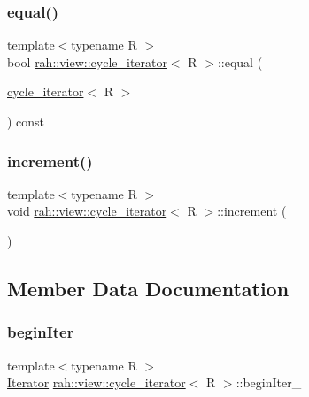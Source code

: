 \subsubsection{\texorpdfstring{equal()}{equal()}}
{\footnotesize\ttfamily template$<$typename R $>$ \\
bool \mbox{\hyperlink{structrah_1_1view_1_1cycle__iterator}{rah\+::view\+::cycle\+\_\+iterator}}$<$ R $>$\+::equal (\begin{DoxyParamCaption}\item[{\mbox{\hyperlink{structrah_1_1view_1_1cycle__iterator}{cycle\+\_\+iterator}}$<$ R $>$}]{ }\end{DoxyParamCaption}) const\hspace{0.3cm}{\ttfamily [inline]}}

\mbox{\label{structrah_1_1view_1_1cycle__iterator_afa27786b512afe924d063245d7bdc3ea}} 
\subsubsection{\texorpdfstring{increment()}{increment()}}
{\footnotesize\ttfamily template$<$typename R $>$ \\
void \mbox{\hyperlink{structrah_1_1view_1_1cycle__iterator}{rah\+::view\+::cycle\+\_\+iterator}}$<$ R $>$\+::increment (\begin{DoxyParamCaption}{ }\end{DoxyParamCaption})\hspace{0.3cm}{\ttfamily [inline]}}



\subsection{Member Data Documentation}
\mbox{\label{structrah_1_1view_1_1cycle__iterator_a1daddc1b5ce6e1203aecb236a04d11d6}} 
\subsubsection{\texorpdfstring{beginIter\_}{beginIter\_}}
{\footnotesize\ttfamily template$<$typename R $>$ \\
\mbox{\hyperlink{structrah_1_1view_1_1cycle__iterator_ac9761016862e6bb26b0ca5e923344b83}{Iterator}} \mbox{\hyperlink{structrah_1_1view_1_1cycle__iterator}{rah\+::view\+::cycle\+\_\+iterator}}$<$ R $>$\+::begin\+Iter\+\_\+}

